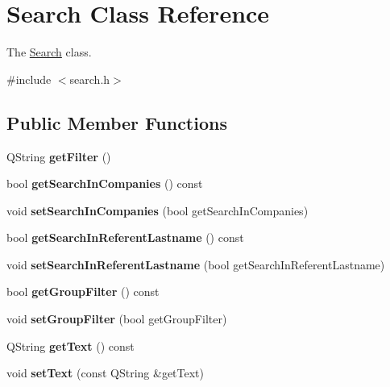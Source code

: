 \hypertarget{classSearch}{\section{Search Class Reference}
\label{classSearch}
}


The \hyperlink{classSearch}{Search} class.  




{\ttfamily \#include $<$search.\-h$>$}

\subsection*{Public Member Functions}
\begin{DoxyCompactItemize}
\item 
\hypertarget{classSearch_ad4cbed03998957eb80a2d1b536407f01}{Q\-String {\bfseries get\-Filter} ()}\label{classSearch_ad4cbed03998957eb80a2d1b536407f01}

\item 
\hypertarget{classSearch_a683100feb68358d1eedda781f700cd46}{bool {\bfseries get\-Search\-In\-Companies} () const }\label{classSearch_a683100feb68358d1eedda781f700cd46}

\item 
\hypertarget{classSearch_a1c2abc83b8995d5b1d908905a7212042}{void {\bfseries set\-Search\-In\-Companies} (bool get\-Search\-In\-Companies)}\label{classSearch_a1c2abc83b8995d5b1d908905a7212042}

\item 
\hypertarget{classSearch_afb76798798f03d34f8d2363d7062ec0f}{bool {\bfseries get\-Search\-In\-Referent\-Lastname} () const }\label{classSearch_afb76798798f03d34f8d2363d7062ec0f}

\item 
\hypertarget{classSearch_a18603321d8e2039b181dbfe082689a08}{void {\bfseries set\-Search\-In\-Referent\-Lastname} (bool get\-Search\-In\-Referent\-Lastname)}\label{classSearch_a18603321d8e2039b181dbfe082689a08}

\item 
\hypertarget{classSearch_a19db0f8c76c414514b9df09e07b4d962}{bool {\bfseries get\-Group\-Filter} () const }\label{classSearch_a19db0f8c76c414514b9df09e07b4d962}

\item 
\hypertarget{classSearch_a8a944b2ece0cafe967afb4334d92b62a}{void {\bfseries set\-Group\-Filter} (bool get\-Group\-Filter)}\label{classSearch_a8a944b2ece0cafe967afb4334d92b62a}

\item 
\hypertarget{classSearch_a10a8f699332477cab0d512027bdaaa44}{Q\-String {\bfseries get\-Text} () const }\label{classSearch_a10a8f699332477cab0d512027bdaaa44}

\item 
\hypertarget{classSearch_a92f09448baccf5cddbc433835b716b36}{void {\bfseries set\-Text} (const Q\-String \&get\-Text)}\label{classSearch_a92f09448baccf5cddbc433835b716b36}

\end{DoxyCompactItemize}


